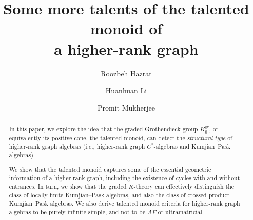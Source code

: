 \documentclass[a4paper,reqno,12pt]{amsart}
\numberwithin{equation}{section}
\theoremstyle{definition}
\theoremstyle{remark}
\newcommand{\gr}{\operatorname{gr}}
\begin{document}
\pagestyle{headings}


\title[Talented monoids of higher-rank graphs]{Some more talents of the talented monoid of\\ a higher-rank graph}

\author{Roozbeh Hazrat}
\address{Roozbeh Hazrat: Centre for Research in Mathematics and Data Science\\Western Sydney University, Australia} 

\author{Huanhuan Li}
\address{Huanhuan Li: Center for Pure Mathematics, School of Mathematical Sciences, Anhui University, Hefei, 230601, China} 

\author{Promit Mukherjee}
\address{Promit Mukherjee: Department of Mathematics, Jadavpur University, Kolkata-700032, India} 



\begin{abstract}
In this paper, we explore the idea that the graded Grothendieck group $K_0^{\gr}$, or equivalently its positive cone, the talented monoid, can detect the \emph{structural type} of higher-rank graph algebras (i.e., higher-rank graph $C^*$-algebras and Kumjian--Pask algebras). 

We show that the talented monoid captures some of the essential geometric information of a higher-rank graph, including the existence of cycles with and without entrances. In turn, we show that the graded $K$-theory can effectively distinguish the class of locally finite Kumjian--Pask algebras, and also the class of crossed product Kumjian--Pask algebras. We also derive talented monoid criteria for higher-rank graph algebras to be purely infinite simple, and not to be $AF$ or ultramatricial. 
\end{abstract}

\maketitle
\end{document}
